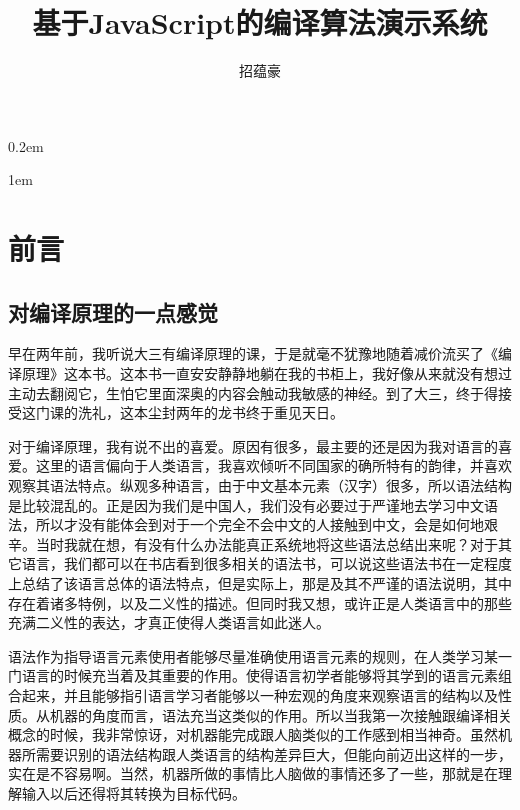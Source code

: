 \documentclass[12pt,leqno]{book}
\begin{document}
\begin{CJK}{UTF8}{gbsn}

\title{\bf{基于JavaScript的编译算法演示系统}}
\author{招蕴豪}
\maketitle
\newpage

\pagestyle{plain}
\parskip 0.2em
\renewcommand{\contentsname}{目录}
\tableofcontents

\parskip 1em
\chapter*{前言}

\section*{对编译原理的一点感觉}
早在两年前，我听说大三有编译原理的课，于是就毫不犹豫地随着减价流买了《编译原理》这本书。这本书一直安安静静地躺在我的书柜上，我好像从来就没有想过主动去翻阅它，生怕它里面深奥的内容会触动我敏感的神经。到了大三，终于得接受这门课的洗礼，这本尘封两年的龙书终于重见天日。

对于编译原理，我有说不出的喜爱。原因有很多，最主要的还是因为我对语言的喜爱。这里的语言偏向于人类语言，我喜欢倾听不同国家的确所特有的韵律，并喜欢观察其语法特点。纵观多种语言，由于中文基本元素（汉字）很多，所以语法结构是比较混乱的。正是因为我们是中国人，我们没有必要过于严谨地去学习中文语法，所以才没有能体会到对于一个完全不会中文的人接触到中文，会是如何地艰辛。当时我就在想，有没有什么办法能真正系统地将这些语法总结出来呢？对于其它语言，我们都可以在书店看到很多相关的语法书，可以说这些语法书在一定程度上总结了该语言总体的语法特点，但是实际上，那是及其不严谨的语法说明，其中存在着诸多特例，以及二义性的描述。但同时我又想，或许正是人类语言中的那些充满二义性的表达，才真正使得人类语言如此迷人。


语法作为指导语言元素使用者能够尽量准确使用语言元素的规则，在人类学习某一门语言的时候充当着及其重要的作用。使得语言初学者能够将其学到的语言元素组合起来，并且能够指引语言学习者能够以一种宏观的角度来观察语言的结构以及性质。从机器的角度而言，语法充当这类似的作用。所以当我第一次接触跟编译相关概念的时候，我非常惊讶，对机器能完成跟人脑类似的工作感到相当神奇。虽然机器所需要识别的语法结构跟人类语言的结构差异巨大，但能向前迈出这样的一步，实在是不容易啊。当然，机器所做的事情比人脑做的事情还多了一些，那就是在理解输入以后还得将其转换为目标代码。


\end{CJK}
\end{document}

